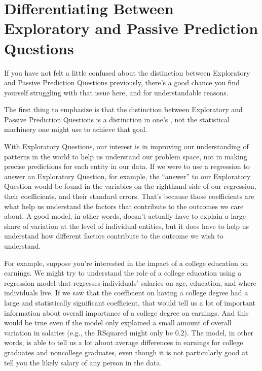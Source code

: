 \documentclass[letterpaper,10pt,english]{jupyterBook}
\begin{document}
\section{Differentiating Between Exploratory and Passive Prediction Questions}
\label{\detokenize{30_questions/20_using_passive_prediction_questions:differentiating-between-exploratory-and-passive-prediction-questions}}
\sphinxAtStartPar
If you have not felt a little confused about the distinction between Exploratory and Passive Prediction Questions previously, there’s a good chance you find yourself struggling with that issue here, and for understandable reasons.

\sphinxAtStartPar
The first thing to emphasize is that the distinction between Exploratory and Passive Prediction Questions is a distinction in one’s , not the statistical machinery one might use to achieve that goal.

\sphinxAtStartPar
With Exploratory Questions, our interest is in improving our understanding of patterns in the world to help us understand our problem space, not in making precise predictions for each entity in our data. If we were to use a regression to answer an Exploratory Question, for example, the “answer” to our Exploratory Question would be found in the variables on the right\sphinxhyphen{}hand side of our regression, their coefficients, and their standard errors. That’s because those coefficients are what help us understand the factors that contribute to the outcomes we care about. A good model, in other words, doesn’t actually have to explain a large share of variation at the level of individual entities, but it does have to help us understand how different factors contribute to the outcome we wish to understand.

\sphinxAtStartPar
For example, suppose you’re interested in the impact of a college education on earnings. We might try to understand the role of a college education using a regression model that regresses individuals’ salaries on age, education, and where individuals live. If we saw that the coefficient on having a college degree had a large and statistically significant coefficient, that would tell us a lot of important information about overall importance of a college degree on earnings. And this would be true even if the model only explained a small amount of overall variation in salaries (e.g., the R\sphinxhyphen{}Squared might only be 0.2). The model, in other words, is able to tell us a lot about average differences in earnings for college graduates and non\sphinxhyphen{}college graduates, even though it is not particularly good at tell you the likely salary of any  person in the data.
\end{document}
